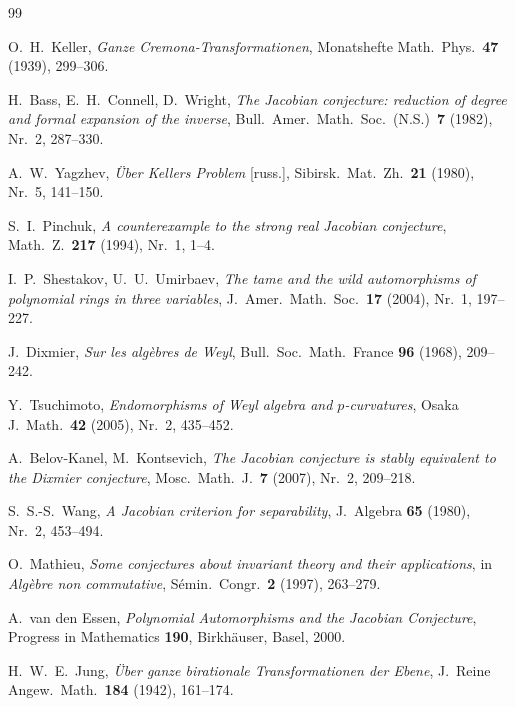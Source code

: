 \documentclass[12pt,a4paper]{amsart}
\theoremstyle{definition}
\theoremstyle{remark}
\begin{document}
\begin{thebibliography}{99}

O.~H.\ Keller,
\textit{Ganze Cremona-Transformationen},
Monatshefte Math.\ Phys.\ \textbf{47} (1939), 299--306.

H.\ Bass, E.~H.\ Connell, D.\ Wright,
\textit{The Jacobian conjecture: reduction of degree and formal expansion of the inverse},
Bull.\ Amer.\ Math.\ Soc.\ (N.S.)\ \textbf{7} (1982), Nr.\ 2, 287--330.

A.~W.\ Yagzhev,
\textit{Über Kellers Problem} [russ.],
Sibirsk.\ Mat.\ Zh.\ \textbf{21} (1980), Nr.\ 5, 141--150.

S.~I.\ Pinchuk,
\textit{A counterexample to the strong real Jacobian conjecture},
Math.\ Z.\ \textbf{217} (1994), Nr.\ 1, 1--4.

I.~P.\ Shestakov, U.~U.\ Umirbaev,
\textit{The tame and the wild automorphisms of polynomial rings in three variables},
J.\ Amer.\ Math.\ Soc.\ \textbf{17} (2004), Nr.\ 1, 197--227.

J.\ Dixmier,
\textit{Sur les algèbres de Weyl},
Bull.\ Soc.\ Math.\ France \textbf{96} (1968), 209--242.

Y.\ Tsuchimoto,
\textit{Endomorphisms of Weyl algebra and $p$-curvatures},
Osaka J.\ Math.\ \textbf{42} (2005), Nr.\ 2, 435--452.

A.\ Belov-Kanel, M.\ Kontsevich,
\textit{The Jacobian conjecture is stably equivalent to the Dixmier conjecture},
Mosc.\ Math.\ J.\ \textbf{7} (2007), Nr.\ 2, 209--218.

S.~S.-S.\ Wang,
\textit{A Jacobian criterion for separability},
J.\ Algebra \textbf{65} (1980), Nr.\ 2, 453--494.

O.\ Mathieu,
\textit{Some conjectures about invariant theory and their applications},
in \textit{Algèbre non commutative}, Sémin.\ Congr.\ \textbf{2} (1997), 263--279.

A.\ van den Essen,
\textit{Polynomial Automorphisms and the Jacobian Conjecture},
Progress in Mathematics \textbf{190}, Birkhäuser, Basel, 2000.

H.~W.~E.\ Jung,
\textit{Über ganze birationale Transformationen der Ebene},
J.\ Reine Angew.\ Math.\ \textbf{184} (1942), 161--174.

\end{thebibliography}
\end{document}
